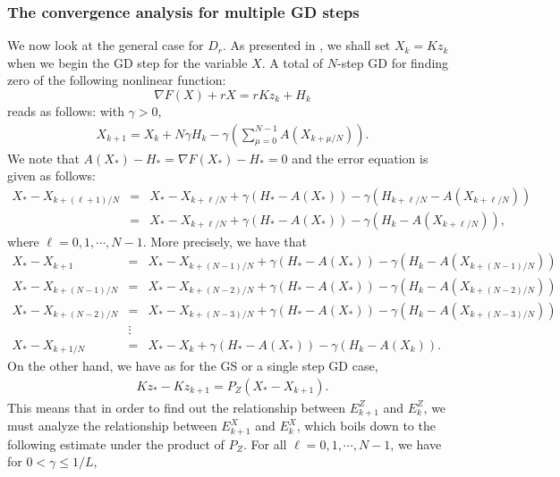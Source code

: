


% 


\subsubsection{The convergence analysis for multiple GD steps}
We now look at the general case for $D_r$. As presented in \cite{mishchenko2022proxskip}, we shall set $X_k = Kz_k$ when we begin the GD step for the variable $X$. A total of $N$-step GD for finding zero of the following nonlinear function: 
\begin{equation} 
\nabla F(X) + r X = rKz_k + H_k 
\end{equation} 
reads as follows: with $\gamma > 0$, 
\begin{eqnarray*} 
X_{k+1} = X_{k} + N \gamma H_k - \gamma \left ( \sum_{\mu = 0}^{N-1} A\left ( X_{k + \mu/N}\right ) \right ).
\end{eqnarray*}
We note that $A(X_*) - H_* = \nabla F(X_*) - H_* = 0$ and the 
error equation is given as follows:  
\begin{eqnarray*}
X_{*} - X_{k+(\ell+1)/N} &=& X_* - X_{k + \ell/N} + \gamma (H_* - A(X_*)) - \gamma(H_{k + \ell/N} - A(X_{k + \ell/N})) \\
&=& X_* - X_{k+\ell/N} + \gamma (H_* - A (X_*)) - \gamma (H_{k} - A(X_{k + \ell/N})),  
\end{eqnarray*}
where $\ell = 0,1,\cdots,N-1$. More precisely, we have that 
\begin{eqnarray*}
X_{*} - X_{k+1} &=& X_* - X_{k + (N-1)/N} + \gamma (H_* - A (X_*)) - \gamma (H_{k} - A(X_{k + (N-1)/N})) \\ 
X_{*} - X_{k+(N-1)/N} &=& X_* - X_{k + (N-2)/N} + \gamma (H_* - A (X_*)) - \gamma (H_{k} - A(X_{k + (N-2)/N})) \\  
X_{*} - X_{k+(N-2)/N} &=& X_* - X_{k + (N-3)/N} + \gamma (H_* - A (X_*)) - \gamma (H_{k} - A(X_{k + (N-3)/N})) \\  
&\vdots& \\ 
X_{*} - X_{k+1/N} &=& X_* - X_{k} + \gamma (H_* - A (X_*)) - \gamma (H_{k} - A(X_{k})).  
\end{eqnarray*}
On the other hand, we have as for the GS or a single step GD case,
\begin{eqnarray*}
Kz_{*} - Kz_{k+1} = P_Z \left ( X_* - X_{k+1} \right ). 
\end{eqnarray*}
This means that in order to find out the relationship between $E_{k+1}^Z$ and $E_k^Z$, we must analyze the relationship between $E_{k+1}^X$ and $E_{k}^X$, which boils down to the following estimate under the product of $P_Z$. For all $\ell = 0,1,\cdots,N-1$, we have for $0 < \gamma \leq 1/L$, 
